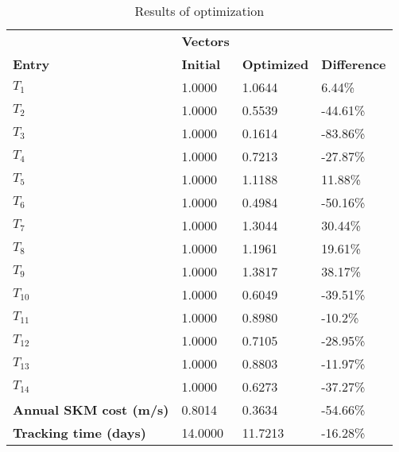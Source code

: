 \begin{table}[H]
\centering
\begin{tabular}{llll}
\textbf{}      & \cellcolor[HTML]{EFEFEF}\textbf{Vectors} & \textbf{} & \textbf{}         \\
\rowcolor[HTML]{EFEFEF} 
\textbf{Entry} & \textbf{Initial} & \textbf{Optimized} & \textbf{Difference} \\
$T_1$ & 1.0000 & 1.0644 & 6.44\% \\ 
$T_2$ & 1.0000 & 0.5539 & -44.61\% \\ 
$T_3$ & 1.0000 & 0.1614 & -83.86\% \\ 
$T_4$ & 1.0000 & 0.7213 & -27.87\% \\ 
$T_5$ & 1.0000 & 1.1188 & 11.88\% \\ 
$T_6$ & 1.0000 & 0.4984 & -50.16\% \\ 
$T_7$ & 1.0000 & 1.3044 & 30.44\% \\ 
$T_8$ & 1.0000 & 1.1961 & 19.61\% \\ 
$T_9$ & 1.0000 & 1.3817 & 38.17\% \\ 
$T_10$ & 1.0000 & 0.6049 & -39.51\% \\ 
$T_11$ & 1.0000 & 0.8980 & -10.2\% \\ 
$T_12$ & 1.0000 & 0.7105 & -28.95\% \\ 
$T_13$ & 1.0000 & 0.8803 & -11.97\% \\ 
$T_14$ & 1.0000 & 0.6273 & -37.27\% \\ 
\rowcolor[HTML]{EFEFEF} 
\textbf{Annual SKM cost (m/s)}  & 0.8014 & 0.3634 & -54.66\% \\ 
\rowcolor[HTML]{EFEFEF} 
\textbf{Tracking time (days)}  & 14.0000 & 11.7213 & -16.28\% \\ 
\end{tabular}
\caption{Results of optimization}
\label{tab:OptimizationAnalysis}
\end{table}